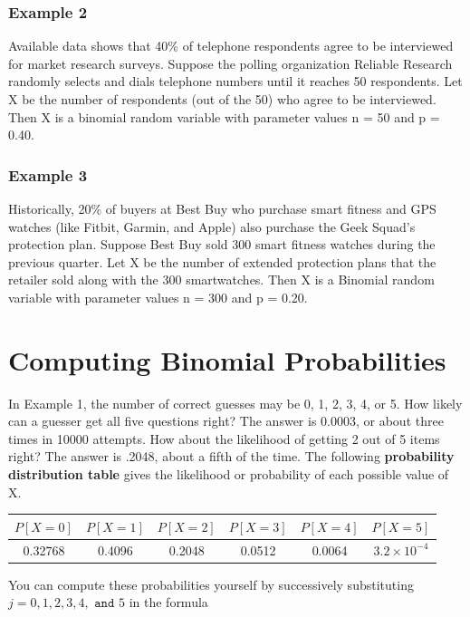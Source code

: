 \documentclass[11pt, chapterprefix=true]{scrbook}\usepackage[]{graphicx}\usepackage[]{color}
\begin{document}
\subsubsection{Example 2} Available data shows that 40\% of telephone respondents agree to be interviewed for market research surveys.  Suppose the polling organization Reliable Research randomly selects and dials telephone numbers until it reaches 50 respondents.  Let X be the number of respondents (out of the 50) who agree to be interviewed.  Then X is a binomial random variable with parameter values n = 50 and p = 0.40.

\subsubsection{Example 3} Historically, 20\% of buyers at Best Buy who purchase smart fitness and GPS watches (like Fitbit, Garmin, and Apple) also purchase the Geek Squad’s protection plan.  Suppose Best Buy sold 300 smart fitness watches during the previous quarter.  Let X be the number of extended protection plans that the retailer sold along with the 300 smartwatches.  Then X is a Binomial random variable with parameter values n = 300 and p = 0.20.

\section{Computing Binomial Probabilities}

In Example 1, the number of correct guesses may be 0, 1, 2, 3, 4, or 5.  How likely can a guesser get all five questions right? The answer is 0.0003, or about three times in 10000 attempts.  How about the likelihood of getting 2 out of 5 items right?  The answer is .2048, about a fifth of the time.  The following \textbf{probability distribution table} gives the likelihood or probability of each possible value of X.



\begin{center}
\begin{tabular}{@{} cccccc @{}} \hline
$P[X = 0]$ & $P[X = 1]$ & $P[X = 2]$ & $P[X = 3]$ & $P[X = 4]$ & $P[X = 5]$ \\ \hline
0.32768 & 0.4096 & 0.2048 & 0.0512 & 0.0064 & \ensuremath{3.2\times 10^{-4}} \\ \hline
\end{tabular}
\end{center}

You can compute these probabilities yourself by successively substituting \\ $j = 0, 1, 2, 3, 4, \texttt{ and } 5$ in the formula
\end{document}
